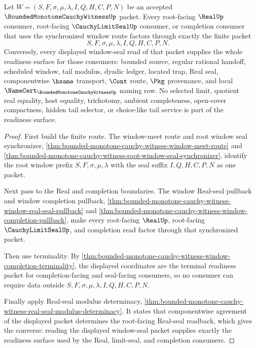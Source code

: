 \begin{theorem}
\label{thm:bounded-monotone-cauchy-witness-window-seal-completeness}
Let $W=(S,F,\sigma,\mu,\lambda,I,Q,H,C,P,N)$ be an accepted $\BoundedMonotoneCauchyWitnessUp$ packet. Every root-facing $\RealUp$ consumer, root-facing $\CauchyLimitSealUp$ consumer, or completion consumer that uses the synchronized window route factors through exactly the finite packet
$$
S,F,\sigma,\mu,\lambda,I,Q,H,C,P,N.
$$
Conversely, every displayed window-seal read of that packet supplies the whole readiness surface for those consumers: bounded source, regular rational handoff, scheduled window, tail modulus, dyadic ledger, located trap, Real seal, componentwise $\hsame$ transport, $\Cont$ route, $\Pkg$ provenance, and local $\NameCert_{\BoundedMonotoneCauchyWitnessUp}$ naming row. No selected limit, quotient real equality, host equality, trichotomy, ambient completeness, open-cover compactness, hidden tail selector, or choice-like tail service is part of the readiness surface.
\end{theorem}
\begin{proof}
First build the finite route. The window-meet route and root window seal synchronizer, \autoref{thm:bounded-monotone-cauchy-witness-window-meet-route} and \autoref{thm:bounded-monotone-cauchy-witness-root-window-seal-synchronizer}, identify the root window prefix $S,F,\sigma,\mu,\lambda$ with the seal suffix $I,Q,H,C,P,N$ as one packet.

Next pass to the Real and completion boundaries. The window Real-seal pullback and window completion pullback, \autoref{thm:bounded-monotone-cauchy-witness-window-real-seal-pullback} and \autoref{thm:bounded-monotone-cauchy-witness-window-completion-pullback}, make every root-facing $\RealUp$, root-facing $\CauchyLimitSealUp$, and completion read factor through that synchronized packet.

Then use terminality. By \autoref{thm:bounded-monotone-cauchy-witness-window-completion-terminality}, the displayed coordinates are the terminal readiness packet for completion-facing and seal-facing consumers, so no consumer can require data outside $S,F,\sigma,\mu,\lambda,I,Q,H,C,P,N$.

Finally apply Real-seal modulus determinacy, \autoref{thm:bounded-monotone-cauchy-witness-real-seal-modulus-determinacy}. It states that componentwise agreement of the displayed packet determines the root-facing Real-seal readback, which gives the converse: reading the displayed window-seal packet supplies exactly the readiness surface used by the Real, limit-seal, and completion consumers.
\end{proof}


